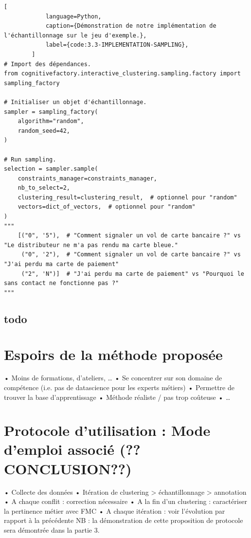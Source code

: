 		\begin{lstlisting}[
			language=Python,
			caption={Démonstration de notre implémentation de l'échantillonnage sur le jeu d'exemple.},
			label={code:3.3-IMPLEMENTATION-SAMPLING},
		]
# Import des dépendances.
from cognitivefactory.interactive_clustering.sampling.factory import sampling_factory

# Initialiser un objet d'échantillonnage.
sampler = sampling_factory(
	algorithm="random",
    random_seed=42,
)

# Run sampling.
selection = sampler.sample(
	constraints_manager=constraints_manager,
	nb_to_select=2,
	clustering_result=clustering_result,  # optionnel pour "random"
	vectors=dict_of_vectors,  # optionnel pour "random"
)
"""
	[("0", '5"),  # "Comment signaler un vol de carte bancaire ?" vs "Le distributeur ne m'a pas rendu ma carte bleue."
	 ("0", '2"),  # "Comment signaler un vol de carte bancaire ?" vs "J'ai perdu ma carte de paiement"
	 ("2", 'N")]  # "J'ai perdu ma carte de paiement" vs "Pourquoi le sans contact ne fonctionne pas ?"
"""
		\end{lstlisting}
		

		\subsection{todo}

    
    \section{Espoirs de la méthode proposée}

        •	Moins de formations, d’ateliers, …
        •	Se concentrer sur son domaine de compétence (i.e. pas de datascience pour les experts métiers)
        •	Permettre de trouver la base d’apprentissage
        •	Méthode réaliste / pas trop coûteuse
        •	…
 
    
    \section{Protocole d'utilisation : Mode d'emploi associé (??CONCLUSION??)}

        •	Collecte des données
        •	Itération de clustering > échantillonnage > annotation
        •	A chaque conflit : correction nécessaire
        •	A la fin d’un clustering : caractériser la pertinence métier avec FMC
        •	A chaque itération : voir l’évolution par rapport à la précédente
        NB : la démonstration de cette proposition de protocole sera démontrée dans la partie 3.